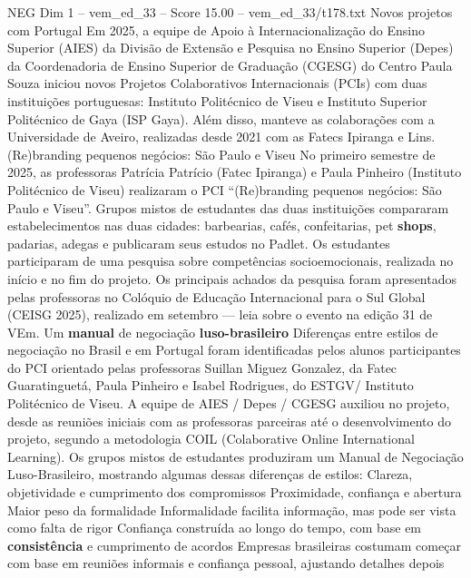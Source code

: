 \begin{textsample}{NEG Dim 1 – vem\_ed\_33 – Score 15.00 – vem\_ed\_33/t178.txt}  \label{ex:f1_neg_112}
Novos projetos com Portugal Em 2025, a equipe de Apoio à Internacionalização do Ensino Superior (AIES) da Divisão de Extensão e Pesquisa no Ensino Superior (Depes) da Coordenadoria de Ensino Superior de Graduação (CGESG) do Centro Paula Souza iniciou novos Projetos Colaborativos Internacionais (PCIs) com duas instituições portuguesas: Instituto Politécnico de Viseu e Instituto Superior Politécnico de Gaya (ISP Gaya).
Além disso, manteve as colaborações com a Universidade de Aveiro, realizadas desde 2021 com as Fatecs Ipiranga e Lins. (Re)branding pequenos negócios: São Paulo e Viseu No primeiro semestre de 2025, as professoras Patrícia Patrício (Fatec Ipiranga) e Paula Pinheiro (Instituto Politécnico de Viseu) realizaram o PCI “(Re)branding pequenos negócios: São Paulo e Viseu”.
Grupos mistos de estudantes das duas instituições compararam estabelecimentos nas duas cidades: barbearias, cafés, confeitarias, pet \textbf{shops}, padarias, adegas e publicaram seus estudos no Padlet.
Os estudantes participaram de uma pesquisa sobre competências socioemocionais, realizada no início e no fim do projeto.
Os principais achados da pesquisa foram apresentados pelas professoras no Colóquio de Educação Internacional para o Sul Global (CEISG 2025), realizado em setembro — leia sobre o evento na edição 31 de VEm.
Um \textbf{manual} de negociação \textbf{luso-brasileiro} Diferenças entre estilos de negociação no Brasil e em Portugal foram identificadas pelos alunos participantes do PCI orientado pelas professoras Suillan Miguez Gonzalez, da Fatec Guaratinguetá, Paula Pinheiro e Isabel Rodrigues, do ESTGV/ Instituto Politécnico de Viseu.
A equipe de AIES / Depes / CGESG auxiliou no projeto, desde as reuniões iniciais com as professoras parceiras até o desenvolvimento do projeto, segundo a metodologia COIL (Colaborative Online International Learning).
Os grupos mistos de estudantes produziram um Manual de Negociação Luso-Brasileiro, mostrando algumas dessas diferenças de estilos: Clareza, objetividade e cumprimento dos compromissos Proximidade, confiança e abertura Maior peso da formalidade Informalidade facilita informação, mas pode ser vista como falta de rigor Confiança construída ao longo do tempo, com base em \textbf{consistência} e cumprimento de acordos Empresas brasileiras costumam começar com base em reuniões informais e confiança pessoal, ajustando detalhes depois

\end{textsample}
